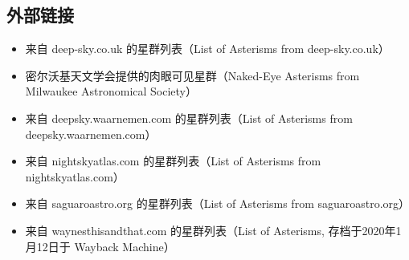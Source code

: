 \subsection{外部链接}
\begin{itemize}
\item 来自 deep-sky.co.uk 的星群列表（List of Asterisms from deep-sky.co.uk）  
\item 密尔沃基天文学会提供的肉眼可见星群（Naked-Eye Asterisms from Milwaukee Astronomical Society）  
\item 来自 deepsky.waarnemen.com 的星群列表（List of Asterisms from deepsky.waarnemen.com）  
\item 来自 nightskyatlas.com 的星群列表（List of Asterisms from nightskyatlas.com）  
\item 来自 saguaroastro.org 的星群列表（List of Asterisms from saguaroastro.org）  
\item 来自 waynesthisandthat.com 的星群列表（List of Asterisms, 存档于2020年1月12日于 Wayback Machine）  
\end{itemize}

